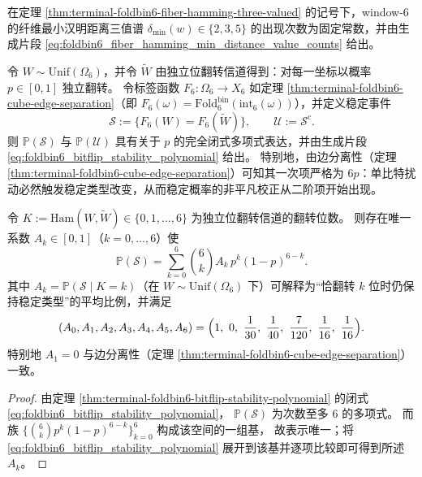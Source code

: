 \begin{corollary}\label{cor:terminal-foldbin6-fiber-hamming-min-distance-histogram}
在定理 \ref{thm:terminal-foldbin6-fiber-hamming-three-valued} 的记号下，window-\(6\) 的纤维最小汉明距离三值谱
\(\delta_{\min}(w)\in\{2,3,5\}\) 的出现次数为固定常数，并由生成片段 \eqref{eq:foldbin6_fiber_hamming_min_distance_value_counts} 给出。
\end{corollary}



\begin{theorem}\label{thm:terminal-foldbin6-bitflip-stability-polynomial}
令 \(W\sim\mathrm{Unif}(\Omega_6)\)，并令 \(\widetilde W\) 由独立位翻转信道得到：对每一坐标以概率 \(p\in[0,1]\) 独立翻转。
令标签函数 \(F_6:\Omega_6\to X_6\) 如定理 \ref{thm:terminal-foldbin6-cube-edge-separation}（即 \(F_6(\omega)=\mathrm{Fold}^{\mathrm{bin}}_6(\mathrm{int}_6(\omega))\)），并定义稳定事件
\[
\mathcal S:=\{F_6(W)=F_6(\widetilde W)\},
\qquad
\mathcal U:=\mathcal S^c.
\]
则 \(\mathbb{P}(\mathcal S)\) 与 \(\mathbb{P}(\mathcal U)\) 具有关于 \(p\) 的完全闭式多项式表达，并由生成片段 \eqref{eq:foldbin6_bitflip_stability_polynomial} 给出。
特别地，由边分离性（定理 \ref{thm:terminal-foldbin6-cube-edge-separation}）可知其一次项严格为 \(6p\)：单比特扰动必然触发稳定类型改变，从而稳定概率的非平凡校正从二阶项开始出现。
\end{theorem}


\begin{corollary}\label{cor:terminal-foldbin6-bitflip-stability-Ak}
令 \(K:=\mathrm{Ham}(W,\widetilde W)\in\{0,1,\dots,6\}\) 为独立位翻转信道的翻转位数。
则存在唯一系数 \(A_k\in[0,1]\)（\(k=0,\dots,6\)）使
\[
\mathbb{P}(\mathcal S)=\sum_{k=0}^{6}\binom{6}{k}A_k\,p^{k}(1-p)^{6-k}.
\]
其中 \(A_k=\mathbb{P}(\mathcal S\mid K=k)\)（在 \(W\sim\mathrm{Unif}(\Omega_6)\) 下）可解释为“恰翻转 \(k\) 位时仍保持稳定类型”的平均比例，并满足
\[
(A_0,A_1,A_2,A_3,A_4,A_5,A_6)=\Bigl(1,\ 0,\ \frac{1}{30},\ \frac{1}{40},\ \frac{7}{120},\ \frac{1}{16},\ \frac{1}{16}\Bigr).
\]
特别地 \(A_1=0\) 与边分离性（定理 \ref{thm:terminal-foldbin6-cube-edge-separation}）一致。
\end{corollary}
\begin{proof}
由定理 \ref{thm:terminal-foldbin6-bitflip-stability-polynomial} 的闭式 \eqref{eq:foldbin6_bitflip_stability_polynomial}，
\(\mathbb{P}(\mathcal S)\) 为次数至多 \(6\) 的多项式。
而族 \(\{\binom{6}{k}p^k(1-p)^{6-k}\}_{k=0}^6\) 构成该空间的一组基，
故表示唯一；将 \eqref{eq:foldbin6_bitflip_stability_polynomial} 展开到该基并逐项比较即可得到所述 \(A_k\)。
\end{proof}

